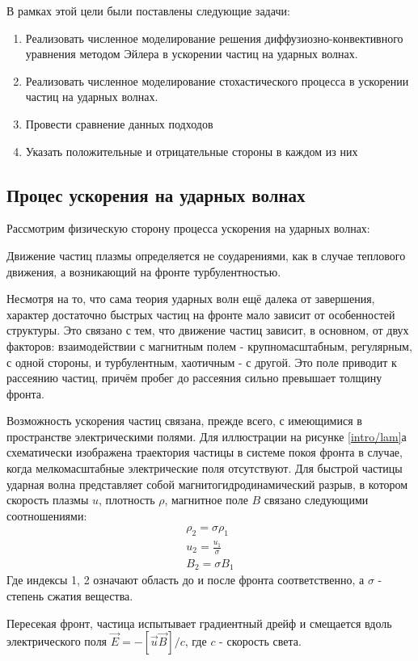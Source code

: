 \documentclass[a4paper,11pt]{article} %
\begin{document}
В рамках этой цели были поставлены следующие задачи:
\begin{enumerate}
\item Реализовать численное моделирование решения диффузиозно-конвективного уравнения методом Эйлера в ускорении частиц на ударных волнах.
\item Реализовать численное моделирование стохастического процесса в ускорении частиц на ударных волнах.
\item Провести сравнение данных подходов
\item Указать положительные и отрицательные стороны в каждом из них
\end{enumerate}

\subsection{Процес ускорения на ударных волнах}
Рассмотрим физическую сторону процесса ускорения на ударных волнах:

Движение частиц плазмы определяется не соударениями, как в случае теплового движения, а возникающий на фронте турбулентностью.

Несмотря на то, что сама теория ударных волн ещё далека от завершения, характер достаточно быстрых частиц на фронте мало зависит от особенностей структуры. Это связано с тем, что движение частиц зависит, в основном, от двух факторов: взаимодействии с магнитным полем - крупномасштабным, регулярным, с одной стороны, и турбулентным, хаотичным - с другой. Это поле приводит к рассеянию частиц, причём пробег до рассеяния сильно превышает толщину фронта.

Возможность ускорения частиц связана, прежде всего, с имеющимися в пространстве электрическими полями. Для иллюстрации на рисунке \ref{intro/lam}а схематически изображена траектория частицы в системе покоя фронта в случае, когда мелкомасштабные электрические поля отсутствуют. Для быстрой частицы ударная волна представляет собой магнитогидродинамический разрыв, в котором скорость плазмы $u$, плотность $\rho$, магнитное поле $B$ связано следующими соотношениями:
\begin{eqnarray}
\rho_2 = \sigma \rho_1\\
u_2=\frac{u_1}{\sigma}\\
B_2=\sigma B_1
\end{eqnarray}
Где индексы 1, 2 означают область до и после фронта соответственно, а $\sigma$ - степень сжатия вещества.

Пересекая фронт, частица испытывает градиентный дрейф и смещается вдоль электрического поля
$\vec{E} = - [\vec{u}\vec{B}]/c$, где $c$ - скорость света.
\end{document}
